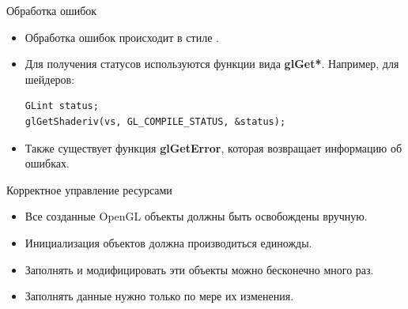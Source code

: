 \documentclass[aspectration=1610,t]{beamer}
\begin{document}
\begin{frame}[fragile]{Обработка ошибок}
    \begin{itemize}
        \item Обработка ошибок происходит в стиле \langc.
        \item Для получения статусов используются функции вида {\bf glGet*}. 
            Например, для шейдеров:
            {\small \begin{lstlisting}
GLint status;
glGetShaderiv(vs, GL_COMPILE_STATUS, &status);
            \end{lstlisting}}
        \item Также существует функция {\bf glGetError}, 
            которая возвращает информацию об ошибках.
    \end{itemize}
\end{frame}

\begin{frame}[fragile]{Корректное управление ресурсами}
    \begin{itemize}
        \item Все созданные OpenGL объекты должны быть освобождены вручную.
        \item Инициализация объектов должна производиться единожды.
        \item Заполнять и модифицировать эти объекты можно бесконечно много раз.
        \item Заполнять данные нужно только по мере их изменения.
    \end{itemize}
\end{frame}
\end{document}

